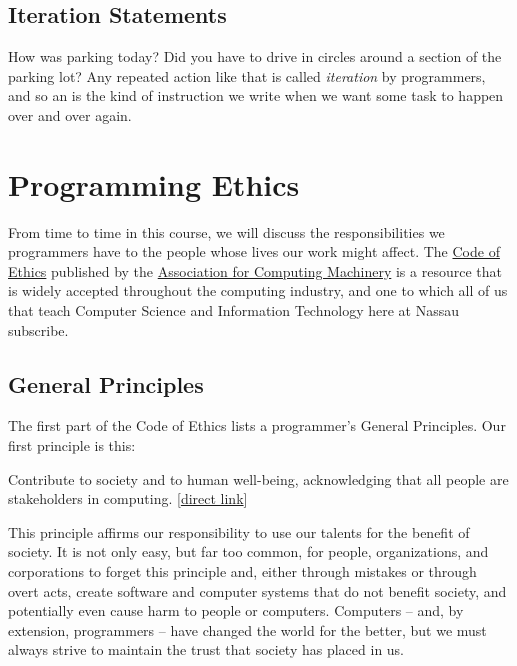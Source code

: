 \subsection{Iteration Statements}

How was parking today?  Did you have to drive in circles around a section of the parking lot?  Any repeated action like that is called \textit{iteration} by programmers, and so an  is the kind of instruction we write when we want some task to happen over and over again.

\section{Programming Ethics}

From time to time in this course, we will discuss the responsibilities we programmers have to the people whose lives our work might affect.  The \href{https://www.acm.org/code-of-ethics}{Code of Ethics} published by the \href{https://www.acm.org/}{Association for Computing Machinery} is a resource that is widely accepted throughout the computing industry, and one to which all of us that teach Computer Science and Information Technology here at Nassau subscribe.

\subsection{General Principles}

The first part of the Code of Ethics lists a programmer's General Principles.  Our first principle is this:

\begin{tcolorbox}[width=\textwidth,colback=black!10]
Contribute to society and to human well-being, acknowledging that all people are stakeholders in computing.  [\href{https://www.acm.org/code-of-ethics#h-1.1-contribute-to-society-and-to-human-well-being,-acknowledging-that-all-people-are-stakeholders-in-computing.}{direct link}]
\end{tcolorbox}

This principle affirms our responsibility to use our talents for the benefit of society.  It is not only easy, but far too common, for people, organizations, and corporations to forget this principle and, either through mistakes or through overt acts, create software and computer systems that do not benefit society, and potentially even cause harm to people or computers.  Computers -- and, by extension, programmers -- have changed the world for the better, but we must always strive to maintain the trust that society has placed in us.

